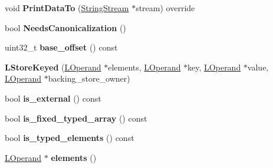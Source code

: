 \begin{DoxyCompactItemize}
\item 
void {\bfseries Print\+Data\+To} (\hyperlink{classv8_1_1internal_1_1_string_stream}{String\+Stream} $\ast$stream) override\hypertarget{classv8_1_1internal_1_1_l_store_keyed_a6904d9c0c8c7e81ec9aab35f73978d38}{}\label{classv8_1_1internal_1_1_l_store_keyed_a6904d9c0c8c7e81ec9aab35f73978d38}

\item 
bool {\bfseries Needs\+Canonicalization} ()\hypertarget{classv8_1_1internal_1_1_l_store_keyed_a638212d8d0abef68447e1451b452ac14}{}\label{classv8_1_1internal_1_1_l_store_keyed_a638212d8d0abef68447e1451b452ac14}

\item 
uint32\+\_\+t {\bfseries base\+\_\+offset} () const \hypertarget{classv8_1_1internal_1_1_l_store_keyed_aa88021608606f53948b262edeccda1e6}{}\label{classv8_1_1internal_1_1_l_store_keyed_aa88021608606f53948b262edeccda1e6}

\item 
{\bfseries L\+Store\+Keyed} (\hyperlink{classv8_1_1internal_1_1_l_operand}{L\+Operand} $\ast$elements, \hyperlink{classv8_1_1internal_1_1_l_operand}{L\+Operand} $\ast$key, \hyperlink{classv8_1_1internal_1_1_l_operand}{L\+Operand} $\ast$value, \hyperlink{classv8_1_1internal_1_1_l_operand}{L\+Operand} $\ast$backing\+\_\+store\+\_\+owner)\hypertarget{classv8_1_1internal_1_1_l_store_keyed_a47d1bf6b00145fbf8fa00f114b545319}{}\label{classv8_1_1internal_1_1_l_store_keyed_a47d1bf6b00145fbf8fa00f114b545319}

\item 
bool {\bfseries is\+\_\+external} () const \hypertarget{classv8_1_1internal_1_1_l_store_keyed_a2bc5b24480f2de96e7a4e42d70508f56}{}\label{classv8_1_1internal_1_1_l_store_keyed_a2bc5b24480f2de96e7a4e42d70508f56}

\item 
bool {\bfseries is\+\_\+fixed\+\_\+typed\+\_\+array} () const \hypertarget{classv8_1_1internal_1_1_l_store_keyed_a9e741b26eae820e0effc84187cef9fd1}{}\label{classv8_1_1internal_1_1_l_store_keyed_a9e741b26eae820e0effc84187cef9fd1}

\item 
bool {\bfseries is\+\_\+typed\+\_\+elements} () const \hypertarget{classv8_1_1internal_1_1_l_store_keyed_ad91e9a80d3e64dedb331d6a8ca4ac730}{}\label{classv8_1_1internal_1_1_l_store_keyed_ad91e9a80d3e64dedb331d6a8ca4ac730}

\item 
\hyperlink{classv8_1_1internal_1_1_l_operand}{L\+Operand} $\ast$ {\bfseries elements} ()\hypertarget{classv8_1_1internal_1_1_l_store_keyed_a65b49dc68849be2f341b9f6db3399248}{}\label{classv8_1_1internal_1_1_l_store_keyed_a65b49dc68849be2f341b9f6db3399248}


\end{DoxyCompactItemize}
